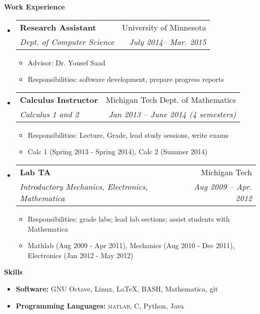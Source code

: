 \documentclass[letterpaper,11pt]{article}
\makeatletter
\newcommand{\resitem}[1]{\item #1 \vspace{-2pt}}
\newcommand{\resheading}[1]{{\large \textbf{#1}}}
\newcommand{\ressubheading}[4]{
\begin{tabular*}{6.5in}{l@{\extracolsep{\fill}}r}
		\textbf{#1} & #2 \\
		\textit{#3} & \textit{#4} \\
\end{tabular*}\vspace{-6pt}}
\makeatother
\begin{document}
\resheading{Work Experience}
\begin{itemize}
\item
    \ressubheading{Research Assistant}{University of Minnesota}{Dept. of Computer Science}{July 2014-- Mar. 2015}
	{\footnotesize
	\begin{itemize}
    \resitem{Advisor: Dr. Yousef Saad}
		\resitem{Responsibilities: software development, prepare progress reports}
	\end{itemize}
  }
\item%
	\ressubheading{Calculus Instructor}{Michigan Tech Dept. of Mathematics}{Calculus 1 and 2}{Jan 2013 -- June 2014 (4 semesters)}
	{\footnotesize
	\begin{itemize}
		\resitem{Responsibilities: Lecture, Grade, lead study sessions, write exams}
    \resitem{Calc 1 (Spring 2013 - Spring 2014), Calc 2 (Summer 2014)}
	\end{itemize}
	}
\item%
	\ressubheading{Lab TA}{Michigan Tech}{Introductory Mechanics, Electronics, Mathematica}{Aug 2009 -- Apr. 2012}
	{\footnotesize
	\begin{itemize}
		\resitem{Responsibilities: grade labs; lead lab sections; assist students with Mathematica}
		\resitem{Mathlab (Aug 2009 - Apr 2011), Mechanics (Aug 2010 - Dec 2011), Electronics (Jan 2012 - May 2012)}
	\end{itemize}
	}
\begin{comment}	
\item%
	\ressubheading{MathLab Lab Consultant}{Michigan Tech Dept. of Mathematical Sciences}{Calculus 1,2, and 3}{Jan. 2009 -- Apr. 2011}
	{\footnotesize
	\begin{itemize}
		\resitem{8 to 15 hours per week}
	\end{itemize}
	}
\end{comment}
\end{itemize}

\resheading{Skills}
\begin{itemize}
	\resitem{\textbf{Software:} GNU Octave, Linux, \LaTeX, BASH, Mathematica, git}
	\resitem{\textbf{Programming Languages:} \textsc{matlab}, C, Python, Java}
\end{itemize}
\end{document}
